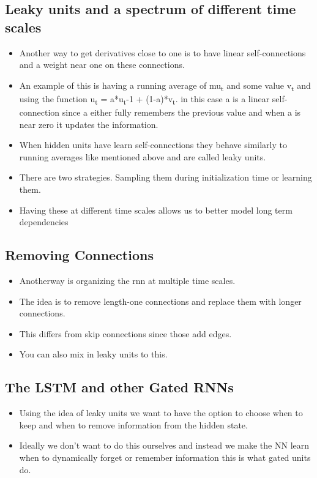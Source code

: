 \documentclass[11pt]{article}
\begin{document}
\subsection{Leaky units and a spectrum of different time scales}
\label{sec:orgf474dce}
\begin{itemize}
\item Another way to get derivatives close to one is to have linear self-connections and a weight near one on these connections.
\item An example of this is having a running average of mu\textsubscript{t} and some value v\textsubscript{t} and using the function u\textsubscript{t} = a*u\textsubscript{t}-1 + (1-a)*v\textsubscript{t}. in this case a is a linear self-connection since a either fully remembers the previous value and when a is near zero it updates the information.
\item When hidden units have learn self-connections they behave similarly to running averages like mentioned above and are called leaky units.
\item There are two strategies. Sampling them during initialization time or learning them.
\item Having these at different time scales allows us to better model long term dependencies
\end{itemize}
\subsection{Removing Connections}
\label{sec:orgddbb668}
\begin{itemize}
\item Anotherway is organizing the rnn at multiple time scales.
\item The idea is to remove length-one connections and replace them with longer connections.
\item This differs from skip connections since those add edges.
\item You can also mix in leaky units to this.
\end{itemize}
\subsection{The LSTM and other Gated RNNs}
\label{sec:orgc473173}
\begin{itemize}
\item Using the idea of leaky units we want to have the option to choose when to keep and when to remove information from the hidden state.
\item Ideally we don't want to do this ourselves and instead we make the NN learn when to dynamically forget or remember information this is what gated units do.
\end{itemize}
\end{document}
